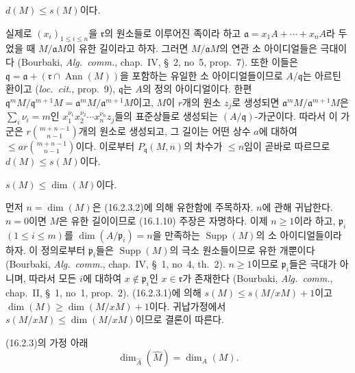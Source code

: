 \begin{env}[16.2.3.3]
\label{0.16.2.3.3-fr}
$d(M)\leq s(M)$이다.
\end{env}

실제로 $(x_i)_{1\leq i\leq n}$을 $\mathfrak{r}$의 원소들로 이루어진
족이라 하고 $\mathfrak{a}=x_1A+\cdots+x_nA$라 두었을 때
$M/\mathfrak{a}M$이 유한 길이라고 하자. 그러면
$M/\mathfrak{a}M$의 연관 소 아이디얼들은 극대이다 (Bourbaki,
\emph{Alg.~comm.}, chap.~IV, \S~2, no~5, prop.~7). 또한 이들은
$\mathfrak{q}=\mathfrak{a}+
(\mathfrak{r}\cap\operatorname{Ann}(M))$을 포함하는 유일한 소
아이디얼들이므로 $A/\mathfrak{q}$는 아르틴 환이고
(\emph{loc.~cit.}, prop.~9), $\mathfrak{q}$는 $A$의 정의 아이디얼이다.
한편 $\mathfrak{q}^mM/\mathfrak{q}^{m+1}M
=\mathfrak{a}^mM/\mathfrak{a}^{m+1}M$이고, $M$이 $r$개의 원소
$z_j$로 생성되면
$\mathfrak{a}^mM/\mathfrak{a}^{m+1}M$은
$\sum_i\nu_i=m$인
$x_1^{\nu_1}x_2^{\nu_2}\cdots x_n^{\nu_n}z_j$들의 표준상들로
생성되는 $(A/\mathfrak{q})$-가군이다. 따라서 이 가군은
$r\binom{m+n-1}{n-1}$개의 원소로 생성되고, 그 길이는 어떤 상수
$a$에 대하여 $\leq ar\binom{m+n-1}{n-1}$이다. 이로부터
$P_{\mathfrak{q}}(M,n)$의 차수가 $\leq n$임이 곧바로 따르므로
$d(M)\leq s(M)$이다.

\begin{env}[16.2.3.4]
\label{0.16.2.3.4-fr}
$s(M)\leq\dim(M)$이다.
\end{env}

먼저 $n=\dim(M)$은 (16.2.3.2)에 의해 유한함에 주목하자. $n$에
관해 귀납한다. $n=0$이면 $M$은 유한 길이이므로 (16.1.10) 주장은
자명하다. 이제 $n\geq1$이라 하고, $\mathfrak{p}_i$
$(1\leq i\leq m)$를
$\dim(A/\mathfrak{p}_i)=n$을 만족하는
$\operatorname{Supp}(M)$의 소 아이디얼들이라 하자. 이 정의로부터
$\mathfrak{p}_i$들은 $\operatorname{Supp}(M)$의 극소 원소들이므로
유한 개뿐이다 (Bourbaki, \emph{Alg.~comm.}, chap.~IV, \S~1,
no~4, th.~2). $n\geq1$이므로 $\mathfrak{p}_i$들은 극대가 아니며,
따라서 모든 $i$에 대하여 $x\notin\mathfrak{p}_i$인
$x\in\mathfrak{r}$가 존재한다 (Bourbaki, \emph{Alg.~comm.},
chap.~II, \S~1, no~1, prop.~2). (16.2.3.1)에 의해
$s(M)\leq s(M/xM)+1$이고
$\dim(M)\geq\dim(M/xM)+1$이다. 귀납가정에서
$s(M/xM)\leq\dim(M/xM)$이므로 결론이 따른다.

\begin{corollary}[16.2.4]
\label{0.16.2.4-fr}
(16.2.3)의 가정 아래
\begin{equation}
\label{0.16.2.4.1-fr}
\tag{16.2.4.1}
  \dim_{\widehat{A}}(\widehat{M})=\dim_A(M).
\end{equation}
\end{corollary}

